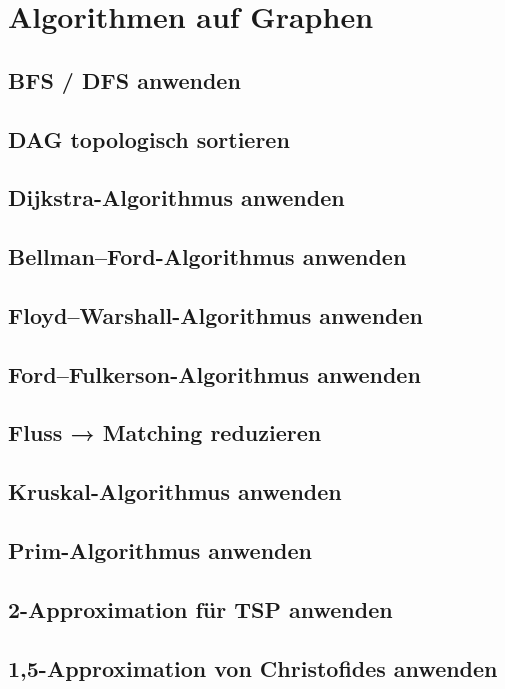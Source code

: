 \chapter{Algorithmen auf Graphen}

\section{BFS / DFS anwenden}

\section{DAG topologisch sortieren}

\section{Dijkstra-Algorithmus anwenden}

\section{Bellman–Ford-Algorithmus anwenden}

\section{Floyd–Warshall-Algorithmus anwenden}

\section{Ford–Fulkerson-Algorithmus anwenden}

\section{Fluss → Matching reduzieren}

\section{Kruskal-Algorithmus anwenden}

\section{Prim-Algorithmus anwenden}

\section{2-Approximation für TSP anwenden}

\section{1,5-Approximation von Christofides anwenden}

